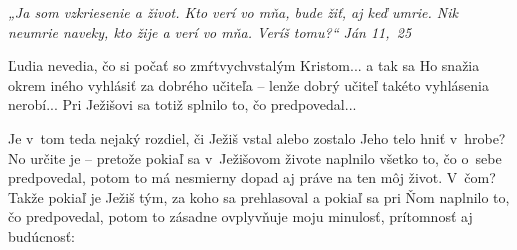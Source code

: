 







{\it „Ja som vzkriesenie a život. Kto verí vo mňa, bude žiť, aj keď umrie. Nik neumrie naveky, kto žije a verí vo mňa. Veríš tomu?“ Ján 11,~25}

Ľudia nevedia, čo si počať so zmŕtvychvstalým Kristom... a tak sa Ho snažia okrem iného vyhlásiť za dobrého učiteľa -- lenže dobrý učiteľ takéto vyhlásenia nerobí...
Pri Ježišovi sa totiž splnilo to, čo predpovedal...

Je v~tom teda nejaký rozdiel,  či Ježiš vstal alebo zostalo Jeho telo hniť v~hrobe? No určite je -- pretože pokiaľ sa v~Ježišovom živote naplnilo všetko to, čo o~sebe predpovedal,  potom to má nesmierny dopad aj práve na ten môj život. V~čom? Takže pokiaľ je Ježiš tým, za koho sa prehlasoval a pokiaľ sa pri Ňom naplnilo to, čo predpovedal, potom to zásadne ovplyvňuje moju minulosť, prítomnosť aj budúcnosť:


